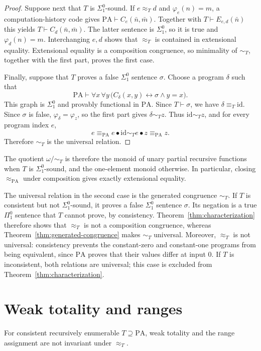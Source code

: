 \documentclass[11pt]{article}
\newcommand{\PA}{\mathrm{PA}}
\begin{document}
\begin{proof}
Suppose next that $T$ is $\Sigma^0_1$-sound. If $e\approx_Td$ and
$\varphi_e(n)=m$, a computation-history code gives
$\PA\vdash C_e(\bar n,\bar m)$. Together with
$T\vdash E_{e,d}(\bar n)$ this yields
$T\vdash C_d(\bar n,\bar m)$. The latter sentence is $\Sigma^0_1$,
so it is true and $\varphi_d(n)=m$. Interchanging $e,d$ shows that
$\approx_T$ is contained in extensional equality. Extensional equality
is a composition congruence, so minimality of $\sim_T$, together with
the first part, proves the first case.

Finally, suppose that $T$ proves a false $\Sigma^0_1$ sentence
$\sigma$. Choose a program $\delta$ such that
\[
 \PA\vdash\forall x\,\forall y\,
 \bigl(C_\delta(x,y)\longleftrightarrow\sigma\land y=x\bigr).
\]
This graph is $\Sigma^0_1$ and provably functional in $\PA$.
Since $T\vdash\sigma$, we have $\delta\equiv_T\mathrm{id}$.
Since $\sigma$ is false, $\varphi_\delta=\varphi_z$, so the first
part gives $\delta\sim_Tz$. Thus $\mathrm{id}\sim_Tz$, and for
every program index $e$,
\[
 e\equiv_{\PA}e\bullet\mathrm{id}
   \sim_Te\bullet z\equiv_{\PA}z.
\]
Therefore $\sim_T$ is the universal relation.
\end{proof}

The quotient $\omega/{\sim_T}$ is therefore the monoid of unary partial
recursive functions when $T$ is $\Sigma^0_1$-sound, and the one-element
monoid otherwise. In particular, closing $\approx_{\PA}$ under composition 
gives exactly extensional equality.

The universal relation in the second case is the generated congruence 
$\sim_T$. If $T$ is consistent but not $\Sigma^0_1$-sound, it proves a
false $\Sigma^0_1$ sentence $\sigma$. Its negation is a true $\Pi^0_1$
sentence that $T$ cannot prove, by consistency.
Theorem~\ref{thm:characterization} therefore shows that $\approx_T$ is
not a composition congruence, whereas
Theorem~\ref{thm:generated-congruence} makes $\sim_T$ universal.
Moreover, $\approx_T$ is not universal: consistency prevents the
constant-zero and constant-one programs from being equivalent, since
$\PA$ proves that their values differ at input $0$.
If $T$ is inconsistent, both relations are universal; this case is
excluded from Theorem~\ref{thm:characterization}.

\section{Weak totality and ranges}\label{sec:applications}

For consistent recursively enumerable $T\supseteq\PA$, weak totality
and the range assignment \cite[Definition~1.1, p.~106, and p.~111]{Montagna}
are not invariant under $\approx_T$.
\end{document}
